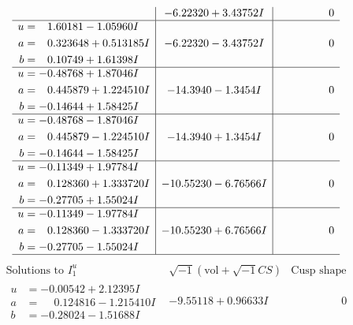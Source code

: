\documentclass[1p]{elsarticle_modified}
\theoremstyle{definition}
\newcommand{\I}{\sqrt{-1}}
\begin{document}
$$\begin{array}{c|c|c}
 & -6.22320 + 3.43752 I & \phantom{-0.000000 } 0 \\ \hline\begin{aligned}
u &= \phantom{-}1.60181 - 1.05960 I \\
a &= \phantom{-}0.323648 + 0.513185 I \\
b &= \phantom{-}0.10749 + 1.61398 I\end{aligned}
 & -6.22320 - 3.43752 I & \phantom{-0.000000 } 0 \\ \hline\begin{aligned}
u &= -0.48768 + 1.87046 I \\
a &= \phantom{-}0.445879 + 1.224510 I \\
b &= -0.14644 + 1.58425 I\end{aligned}
 & -14.3940 - 1.3454 I & \phantom{-0.000000 } 0 \\ \hline\begin{aligned}
u &= -0.48768 - 1.87046 I \\
a &= \phantom{-}0.445879 - 1.224510 I \\
b &= -0.14644 - 1.58425 I\end{aligned}
 & -14.3940 + 1.3454 I & \phantom{-0.000000 } 0 \\ \hline\begin{aligned}
u &= -0.11349 + 1.97784 I \\
a &= \phantom{-}0.128360 + 1.333720 I \\
b &= -0.27705 + 1.55024 I\end{aligned}
 & -10.55230 - 6.76566 I & \phantom{-0.000000 } 0 \\ \hline\begin{aligned}
u &= -0.11349 - 1.97784 I \\
a &= \phantom{-}0.128360 - 1.333720 I \\
b &= -0.27705 - 1.55024 I\end{aligned}
 & -10.55230 + 6.76566 I & \phantom{-0.000000 } 0\\
 \hline 
 \end{array}$$\newpage$$\begin{array}{c|c|c}  
\text{Solutions to }I^u_{1}& \I (\text{vol} + \sqrt{-1}CS) & \text{Cusp shape}\\
 \hline 
\begin{aligned}
u &= -0.00542 + 2.12395 I \\
a &= \phantom{-}0.124816 - 1.215410 I \\
b &= -0.28024 - 1.51688 I\end{aligned}
 & -9.55118 + 0.96633 I & \phantom{-0.000000 } 0 \\ \hline\begin{aligned}

\end{aligned}
\end{array}$$
\end{document}
